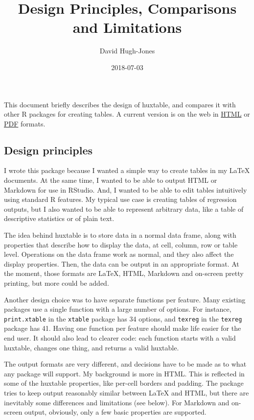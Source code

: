 \documentclass[]{article}
\title{Design Principles, Comparisons and Limitations}
\author{David Hugh-Jones}
\date{2018-07-03}
\begin{document}
\maketitle

This document briefly describes the design of huxtable, and compares it
with other R packages for creating tables. A current version is on the
web in
\href{http://hughjonesd.github.io/huxtable/design-principles.html}{HTML}
or
\href{http://hughjonesd.github.io/huxtable/design-principles.pdf}{PDF}
formats.

\subsection{Design principles}\label{design-principles}

I wrote this package because I wanted a simple way to create tables in
my LaTeX documents. At the same time, I wanted to be able to output HTML
or Markdown for use in RStudio. And, I wanted to be able to edit tables
intuitively using standard R features. My typical use case is creating
tables of regression outputs, but I also wanted to be able to represent
arbitrary data, like a table of descriptive statistics or of plain text.

The idea behind huxtable is to store data in a normal data frame, along
with properties that describe how to display the data, at cell, column,
row or table level. Operations on the data frame work as normal, and
they also affect the display properties. Then, the data can be output in
an appropriate format. At the moment, those formats are LaTeX, HTML,
Markdown and on-screen pretty printing, but more could be added.

Another design choice was to have separate functions per feature. Many
existing packages use a single function with a large number of options.
For instance, \texttt{print.xtable} in the \texttt{xtable} package has
34 options, and \texttt{texreg} in the \texttt{texreg} package has 41.
Having one function per feature should make life easier for the end
user. It should also lead to clearer code: each function starts with a
valid huxtable, changes one thing, and returns a valid huxtable.

The output formats are very different, and decisions have to be made as
to what any package will support. My background is more in HTML. This is
reflected in some of the huxtable properties, like per-cell borders and
padding. The package tries to keep output reasonably similar between
LaTeX and HTML, but there are inevitably some differences and
limitations (see below). For Markdown and on-screen output, obviously,
only a few basic properties are supported.
\end{document}
